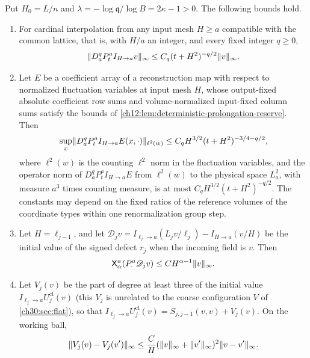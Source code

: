 \begin{lemma}\label{ch30:lem:calculus}
Put $H_0=L/n$ and $\lambda=-\log\mathfrak q/\log B=2\kappa-1>0$. The following bounds hold.
\begin{enumerate}
\item For cardinal interpolation from any input mesh $H\ge a$ compatible with the common lattice, that is, with $H/a$ an integer, and every fixed integer $q\ge0$,
\begin{equation}\label{ch30:eq:cardinal-heat}
 \lVert D_a^qP_t^aI_{H\to a}v\rVert_\infty\le C_q(t+H^2)^{-q/2}\lVert v\rVert_\infty .
\end{equation}
\item Let $E$ be a coefficient array of a reconstruction map with respect to normalized fluctuation variables at input mesh $H$, whose output-fixed absolute coefficient row sums and volume-normalized input-fixed column sums satisfy the bounds of \cref{ch12:lem:deterministic-prolongation-reserve}. Then
\begin{equation}\label{ch30:eq:white-heat}
 \sup_x\lVert D_a^qP_t^aI_{H\to a}E(x,\cdot)\rVert_{\ell^2(w)}\le C_qH^{3/2}(t+H^2)^{-3/4-q/2},
\end{equation}
where $\ell^2(w)$ is the counting $\ell^2$ norm in the fluctuation variables, and the operator norm of $D_a^qP_t^aI_{H\to a}E$ from $\ell^2(w)$ to the physical space $L_a^2$, with measure $a^3$ times counting measure, is at most $C_qH^{3/2}(t+H^2)^{-q/2}$. The constants may depend on the fixed ratios of the reference volumes of the coordinate types within one renormalization group step.
\item Let $H=\ell_{j-1}$, and let $\mathscr D_jv=I_{\ell_j\to a}(L_jv/\ell_j)-I_{H\to a}(v/H)$ be the initial value of the signed defect $r_j$ when the incoming field is $v$. Then
\begin{equation}\label{ch30:eq:signed-radius}
 \mathsf X_\alpha^a(P_\cdot^a\mathscr D_jv)\le CH^{\alpha-1}\lVert v\rVert_\infty .
\end{equation}
\item Let $V_j(v)$ be the part of degree at least three of the initial value $I_{\ell_j\to a}U_j^{\mathrm{cl}}(v)$ (this $V_j$ is unrelated to the coarse configuration $V$ of \cref{ch30:sec:flat}), so that $I_{\ell_j\to a}U_j^{\mathrm{cl}}(v)=S_{j,j-1}(v,v)+V_j(v)$. On the working ball,
\begin{equation}\label{ch30:eq:local-cubic}
 \lVert V_j(v)-V_j(v')\rVert_\infty
 \le\frac CH(\lVert v\rVert_\infty+\lVert v'\rVert_\infty)^2\lVert v-v'\rVert_\infty .
\end{equation}

\end{enumerate}
\end{lemma}
